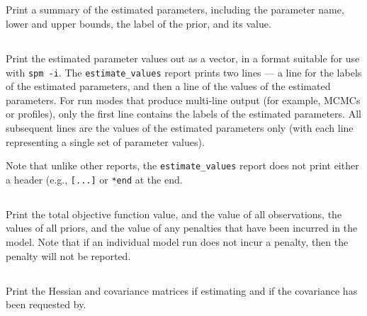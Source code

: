 \subsection{}

Print a summary of the estimated parameters, including the parameter name, lower and upper bounds, the label of the prior, and its value.

\subsection{}

Print the estimated parameter values out as a vector, in a format suitable for use with \texttt{spm -i}. The \texttt{estimate\_values} report prints two lines --- a line for the labels of the estimated parameters, and then a line of the values of the estimated parameters. For run modes that produce multi-line output (for example, MCMCs or profiles), only the first line contains the labels of the  estimated parameters. All subsequent lines are the values of the estimated parameters only (with each line representing a single set of parameter values). 

Note that unlike other reports, the \texttt{estimate\_values} report does not print either a header (e.g., \texttt{[...]} or \texttt{*end} at the end. 

\subsection{}

Print the total objective function value, and the value of all observations, the values of all priors, and the value of any penalties that have been incurred in the model. Note that if an individual model run does not incur a penalty, then the penalty will not be reported.

\subsection{}

Print the Hessian and covariance matrices if estimating and if the covariance has been requested by.

